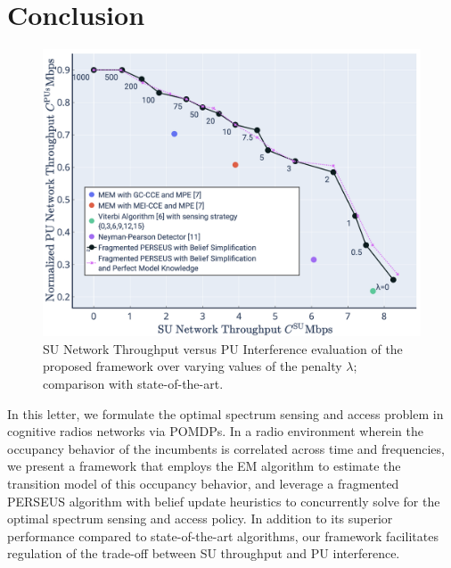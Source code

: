 \documentclass[10pt,twocolumn]{IEEEtran}
\begin{document}
\section{Conclusion}\label{V}
\begin{figure}
    \centering
    \includegraphics[width=0.8\linewidth]{SU_Throughput_PU_Interference_Varying_Penalty.png}
    \caption{SU Network Throughput versus PU Interference evaluation of the proposed framework over varying values of the penalty $\lambda$; comparison with state-of-the-art.}
    \vspace{-5mm}
    \label{fig:8}
\end{figure}
In this letter, we formulate the optimal spectrum sensing and access problem in cognitive radios networks via POMDPs. In a radio environment wherein the occupancy behavior of the incumbents is correlated across time and frequencies, we present a framework that employs the EM algorithm to estimate the transition model of this occupancy behavior, and leverage a fragmented PERSEUS algorithm with belief update heuristics to concurrently solve for the optimal spectrum sensing and access policy. In addition to its superior performance compared to state-of-the-art algorithms, our framework facilitates regulation of the trade-off between SU throughput and PU interference.

\vspace{-5.5mm}

\end{document}
